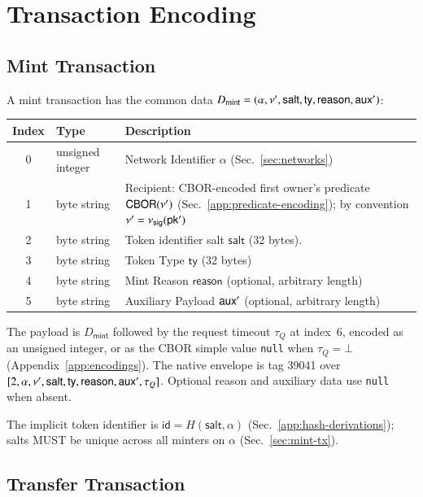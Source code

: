 

\section{Transaction Encoding}\label{app:transaction-encoding}

\subsection{Mint Transaction}

A mint transaction has the common data
$D_\mathsf{mint} = (\alpha, \nu', \mathsf{salt}, \mathsf{ty}, \mathsf{reason}, \mathsf{aux}')$:

\begin{longtable}{clp{10cm}}
\textbf{Index} & \textbf{Type} & \textbf{Description} \\
\hline
0 & unsigned integer & Network Identifier $\alpha$ (Sec.~\ref{sec:networks}) \\
1 & byte string & Recipient: CBOR-encoded first owner's predicate $\mathsf{CBOR}(\nu')$ (Sec.~\ref{app:predicate-encoding}); by convention $\nu' = \nu_\mathsf{sig}(\mathsf{pk'})$ \\
2 & byte string & Token identifier salt $\mathsf{salt}$ (32 bytes). \\
3 & byte string & Token Type $\mathsf{ty}$ (32 bytes) \\
4 & byte string & Mint Reason $\mathsf{reason}$ (optional, arbitrary length) \\
5 & byte string & Auxiliary Payload $\mathsf{aux}'$ (optional, arbitrary length) \\
\end{longtable}

The payload is $D_\mathsf{mint}$ followed by the request timeout $\tau_Q$ at index~6, encoded as an unsigned integer, or as the CBOR simple value \texttt{null} when $\tau_Q=\bot$ (Appendix~\ref{app:encodings}). The native envelope is tag 39041 over $[2,\alpha,\nu',\mathsf{salt},\mathsf{ty},\mathsf{reason},\mathsf{aux}',\tau_Q]$. Optional reason and auxiliary data use \texttt{null} when absent.

The implicit token identifier is $\mathsf{id} = H(\mathsf{salt}, \alpha)$ (Sec.~\ref{app:hash-derivations}); salts MUST be unique across all minters on $\alpha$ (Sec.~\ref{sec:mint-tx}).

\subsection{Transfer Transaction}

